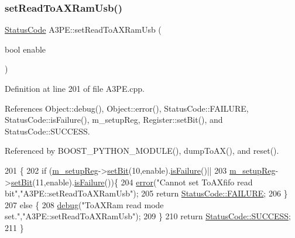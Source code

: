 \subsubsection{\texorpdfstring{set\+Read\+To\+A\+X\+Ram\+Usb()}{setReadToAXRamUsb()}}
{\footnotesize\ttfamily \hyperlink{classStatusCode}{Status\+Code} A3\+P\+E\+::set\+Read\+To\+A\+X\+Ram\+Usb (\begin{DoxyParamCaption}\item[{bool}]{enable }\end{DoxyParamCaption})}



Definition at line 201 of file A3\+P\+E.\+cpp.



References Object\+::debug(), Object\+::error(), Status\+Code\+::\+F\+A\+I\+L\+U\+RE, Status\+Code\+::is\+Failure(), m\+\_\+setup\+Reg, Register\+::set\+Bit(), and Status\+Code\+::\+S\+U\+C\+C\+E\+SS.



Referenced by B\+O\+O\+S\+T\+\_\+\+P\+Y\+T\+H\+O\+N\+\_\+\+M\+O\+D\+U\+L\+E(), dump\+To\+A\+X(), and reset().


\begin{DoxyCode}
201                                              \{
202   \textcolor{keywordflow}{if} (\hyperlink{classA3PE_a142fa10b7e705c4701ae21678ec2ec8a}{m\_setupReg}->\hyperlink{classRegister_ab094246dd12aa7e0aa0ca917f4e70b31}{setBit}(10,enable).\hyperlink{classStatusCode_a5dd22dc6eb2c52fc4cabc58f6dea2eb7}{isFailure}()||
203       \hyperlink{classA3PE_a142fa10b7e705c4701ae21678ec2ec8a}{m\_setupReg}->\hyperlink{classRegister_ab094246dd12aa7e0aa0ca917f4e70b31}{setBit}(11,enable).\hyperlink{classStatusCode_a5dd22dc6eb2c52fc4cabc58f6dea2eb7}{isFailure}())\{
204     \hyperlink{classObject_a204a95f57818c0f811933917a30eff45}{error}(\textcolor{stringliteral}{"Cannot set ToAXfifo read bit"},\textcolor{stringliteral}{"A3PE::setReadToAXRamUsb"});
205     \textcolor{keywordflow}{return} \hyperlink{classStatusCode_a6f565cbeadc76d14c72f047e5e85eb4ba3da73d4c469762eb9d3c960368252b26}{StatusCode::FAILURE};
206   \}
207   \textcolor{keywordflow}{else} \{
208     \hyperlink{classObject_aac010553f022165573714b7014a15f0d}{debug}(\textcolor{stringliteral}{"ToAXRam read mode set."},\textcolor{stringliteral}{"A3PE::setReadToAXRamUsb"});
209   \}
210   \textcolor{keywordflow}{return} \hyperlink{classStatusCode_a6f565cbeadc76d14c72f047e5e85eb4badd0da38d3ba0d922efd1f4619bc37ad8}{StatusCode::SUCCESS};
211 \}
\end{DoxyCode}
\mbox{\label{classA3PE_a1d0dd1db3c493bc31aa56b55e7439e0e}} 
